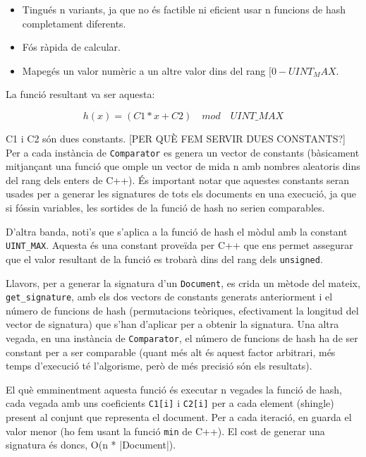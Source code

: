 \documentclass[catalan, 12pt]{report}
\begin{document}
\begin{itemize}
\item Tingués n variants, ja que no és factible ni eficient usar n funcions de hash completament diferents.
\item Fós ràpida de calcular.
\item Mapegés un valor numèric a un altre valor dins del rang \([0 - UINT_MAX\).
\end{itemize}

La funció resultant va ser aquesta:

\[h(x) = (C1 * x + C2) \quad mod \quad UINT\_MAX \]

C1 i C2 són dues constants. [PER QUÈ FEM SERVIR DUES CONSTANTS?] Per a cada instància de \verb|Comparator| es genera un vector de constants (bàsicament mitjançant una funció que omple un vector de mida n amb nombres aleatoris dins del rang dels enters de C++). És important notar que aquestes constants seran usades per a generar les signatures de tots els documents en una execució, ja que si fóssin variables, les sortides de la funció de hash no serien comparables.\newline

D'altra banda, noti's que s'aplica a la funció de hash el mòdul amb la constant \verb|UINT_MAX|. Aquesta és una constant proveïda per C++ que ens permet assegurar que el valor resultant de la funció es trobarà dins del rang dels \verb|unsigned|.\newline

Llavors, per a generar la signatura d'un \verb|Document|, es crida un mètode del mateix, \verb|get_signature|, amb els dos vectors de constants generats anteriorment i el número de funcions de hash (permutacions teòriques, efectivament la longitud del vector de signatura) que s'han d'aplicar per a obtenir la signatura. Una altra vegada, en una instància de \verb|Comparator|, el número de funcions de hash ha de ser constant per a ser comparable (quant més alt és aquest factor arbitrari, més temps d'execució té l'algorisme, però de més precisió són els resultats).\newline 

El què emminentment aquesta funció és executar n vegades la funció de hash, cada vegada amb uns coeficients \verb|C1[i]| i \verb|C2[i]| per a cada element (shingle) present al conjunt que representa el document. Per a cada iteració, en guarda el valor menor (ho fem usant la funció \verb|min| de C++). El cost de generar una signatura és doncs, O(n * |Document|).\newline
\end{document}
